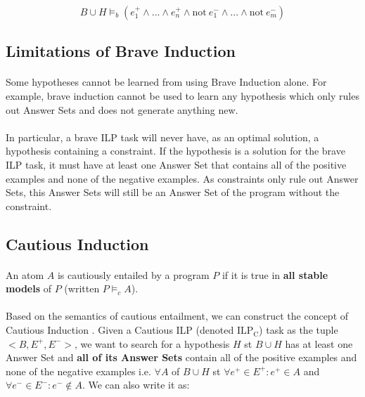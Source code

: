 \documentclass{article}
\theoremstyle{plain}
\theoremstyle{definition}
\begin{document}
\begin{multicols}{2}
$$B \cup H \models_b (e_1^+ \land ... \land e_n^+ \land \text{not}\ e_1^- \land ...  \land \text{not}\ e_m^-)$$

\subsection{Limitations of Brave Induction}\label{sec:BraveInductionLimitations}

\paragraph{} Some hypotheses cannot be learned from using Brave Induction alone. For example, brave induction cannot be used to learn any hypothesis which only rules out Answer Sets and does not generate anything new.

\paragraph{} In particular, a brave ILP task will never have, as an optimal solution, a hypothesis containing a constraint. If the hypothesis is a solution for the brave ILP task, it must have at least one Answer Set that contains all of the positive examples and none of the negative examples. As constraints only rule out Answer Sets, this Answer Sets will still be an Answer Set of the program without the constraint.

\subsection{Cautious Induction}
\paragraph{} An atom $A$ is cautiously entailed by a program $P$ if it is true in \textbf{all stable models} of $P$ (written $P \models_c A$).

\paragraph{} Based on the semantics of cautious entailment, we can construct the concept of Cautious Induction  \cite{sakama08}. Given a Cautious ILP (denoted $\text{ILP}_\text{C}$) task as the tuple $<B, E^+, E^->$, we want to search for a hypothesis $H$ st $B \cup H$ has at least one Answer Set and \textbf{all of its Answer Sets} contain all of the positive examples and none of the negative examples i.e. $\forall A$ of $B \cup H$ st $\forall e^+ \in E^+: e^+ \in A$ and $\forall e^- \in E^-: e^- \not\in A$. We can also write it as:


\end{multicols}
\end{document}
